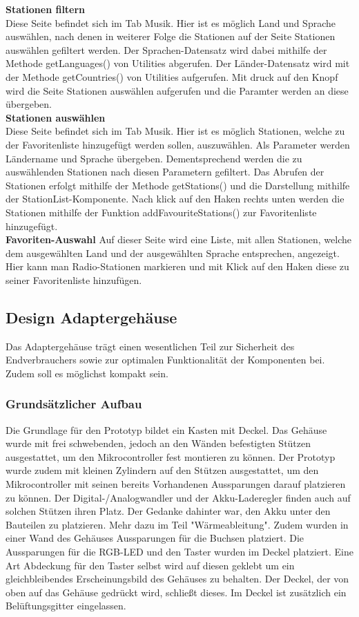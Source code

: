 \documentclass[11pt, twoside]{article}
\begin{document}
\textbf{Stationen filtern} \\
Diese Seite befindet sich im Tab Musik. Hier ist es möglich Land und Sprache auswählen, nach denen in weiterer Folge die Stationen auf der Seite Stationen auswählen gefiltert werden. Der Sprachen-Datensatz wird dabei mithilfe der Methode getLanguages() von Utilities abgerufen. Der Länder-Datensatz wird mit der Methode getCountries() von Utilities aufgerufen. Mit druck auf den Knopf wird die Seite Stationen auswählen aufgerufen und die Paramter werden an diese übergeben. \newline \\
\textbf{Stationen auswählen} \\
Diese Seite befindet sich im Tab Musik. Hier ist es möglich Stationen, welche zu der Favoritenliste hinzugefügt werden sollen, auszuwählen. Als Parameter werden Ländername und Sprache übergeben. Dementsprechend werden die zu auswählenden Stationen nach diesen Parametern gefiltert. Das Abrufen der Stationen erfolgt mithilfe der Methode getStations() und die Darstellung mithilfe der StationList-Komponente. Nach klick auf den Haken rechts unten werden die Stationen mithilfe der Funktion addFavouriteStations() zur Favoritenliste hinzugefügt. \newline\\
\textbf{Favoriten-Auswahl} \newline
Auf dieser Seite wird eine Liste, mit allen Stationen, welche dem ausgewählten Land und der ausgewählten Sprache entsprechen, angezeigt. Hier kann man Radio-Stationen markieren und mit Klick auf den Haken diese zu seiner Favoritenliste hinzufügen. \newline 
\subsection{Design Adaptergehäuse}
Das Adaptergehäuse trägt einen wesentlichen Teil zur Sicherheit des Endverbrauchers sowie zur optimalen Funktionalität der Komponenten bei. Zudem soll es möglichst kompakt sein.
\subsubsection{Grundsätzlicher Aufbau}
Die Grundlage für den Prototyp bildet ein Kasten mit Deckel.\newline
Das Gehäuse wurde mit frei schwebenden, jedoch an den Wänden befestigten Stützen ausgestattet, um den Mikrocontroller fest montieren zu können. Der Prototyp wurde zudem mit kleinen Zylindern auf den Stützen ausgestattet, um den Mikrocontroller mit seinen bereits Vorhandenen Aussparungen darauf platzieren zu können. Der Digital-/Analogwandler und der Akku-Laderegler finden auch auf solchen Stützen ihren Platz. Der Gedanke dahinter war, den Akku unter den Bauteilen zu platzieren. Mehr dazu im Teil "Wärmeableitung". Zudem wurden in einer Wand des Gehäuses Aussparungen für die Buchsen platziert. Die Aussparungen für die RGB-LED und den Taster wurden im Deckel platziert. Eine Art Abdeckung für den Taster selbst wird auf diesen geklebt um ein gleichbleibendes Erscheinungsbild des Gehäuses zu behalten. Der Deckel, der von oben auf das Gehäuse gedrückt wird, schließt dieses. Im Deckel ist zusätzlich ein Belüftungsgitter eingelassen.
\end{document}
